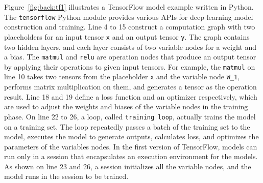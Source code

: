 Figure~\ref{fig:back:tf1} illustrates a TensorFlow model example written in
Python. 
The {\tt tensorflow} Python module provides various APIs for deep learning
model construction and training.
Line 4 to 15 construct a computation graph with two placeholders for an input
tensor {\tt x} and an output tensor {\tt y}.
The graph contains two hidden layers, and each layer consists of two variable
nodes for a weight and a bias.
The {\tt matmul} and {\tt relu} are operation nodes that produce an output
tensor by applying their operations to given input tensors.
For example, the {\tt matmul} on line 10 takes two tensors from the placeholder
{\tt x} and the variable node {\tt W\_1}, performs matrix multiplication on
them, and generates a tensor as the operation result.
Line 18 and 19 define a loss function and an optimizer respectively, which are
used to adjust the weights and biases of the variable nodes in the training
phase.
On line 22 to 26, a loop, called {\tt training loop}, actually trains the model
on a training set. 
The loop repeatedly passes a batch of the training set to the model, executes
the model to generate outputs, calculates loss, and optimizes the parameters of
the variables nodes. 
In the first version of TensorFlow, models can run only in a session that
encapsulates an execution environment for the models.
As shown on line 23 and 26, a session initializes all the variable nodes, and
the model runs in the session to be trained.


